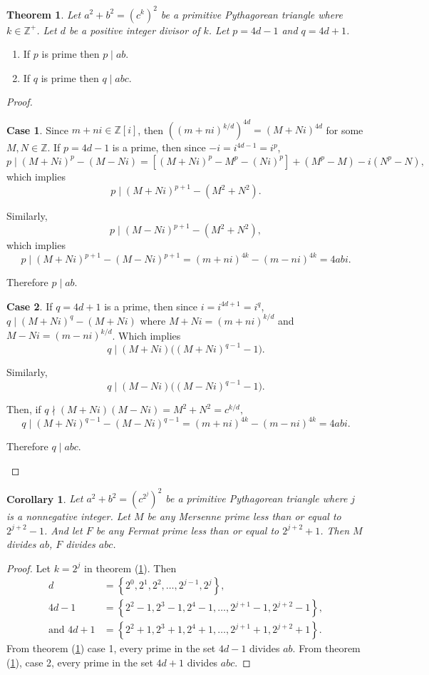 \documentclass{article}
\renewcommand{\labelenumi}{\roman{enumi}.}
\newtheorem{theorem}{Theorem}
\newtheorem{corollary}{Corollary}
\theoremstyle{definition}
\newtheorem{case}{Case}[section]
\begin{document}
\begin{theorem}
Let \(a^2+b^2 = (c^k)^2\) be a primitive Pythagorean triangle where \(k\in \mathbb{Z}^+\). Let \(d\) be a positive integer divisor of \(k\). Let  \(p = 4d-1\) and \(q = 4d+1\).
\label{th:Prime}
\end{theorem}
\renewcommand{\labelenumi}{(\alph{enumi})}
\begin{enumerate}
\item If \(p\) is prime then \(p\mid ab\).
\item If \(q\) is prime then \(q\mid abc\).
\end{enumerate}
\begin{proof}
\begin{case}
Since \(m+ni \in \mathbb{Z}[i]\), then  \(((m+ni)^{k/d})^{4d} = (M+Ni)^{4d}\) for some  \(M, N\in \mathbb{Z}\). If \(p=4d-1\) is a prime, then since \(-i=i^{4d-1}=i^p\), \[ p \mid (M+Ni)^p-(M-Ni)= [ (M+Ni)^p - M^p - (Ni)^p ] + (M^p-M)-i(N^p-N), \] which implies \[ p\mid (M+Ni)^{p+1} - (M^2+N^2). \]

Similarly, \[ p\mid (M-Ni)^{p+1} - ( M^2+N^2 ), \] which implies \[ p \mid  (M+Ni)^{p+1}-(M-Ni)^{p+1} = (m+ni)^{4k}-(m-ni)^{4k} = 4abi. \]

Therefore \(p\mid ab\).
\end{case}
\begin{case}
If \(q = 4d+1\) is a prime, then since  \(i = i^{4d+1} = i^q\), \( q\mid(M+Ni)^q - (M+Ni)\) where  \(M+Ni=(m+ni)^{k/d}\) and \(M-Ni=(m-ni)^{k/d}\). Which implies \[ q\mid (M+Ni) \big((M+Ni)^{q-1}-1\big). \]

Similarly, \[ q\mid(M-Ni) \big((M-Ni)^{q-1}-1\big). \]

Then, if \( q\nmid (M+Ni)(M-Ni) = M^2+N^2 = c^{k/d}, \) \[ q \mid (M+Ni)^{q-1}-(M-Ni)^{q-1} = (m+ni)^{4k}-(m-ni)^{4k}=4abi. \]

Therefore \(q \mid abc\).
\end{case}
\end{proof}

\begin{corollary}
Let \(a^2+b^2 = (c^{2^j})^2\) be a primitive Pythagorean triangle where \(j\) is a nonnegative integer. Let \(M\) be any Mersenne prime less than or equal to \(2^{j+2}-1\). And let \(F\) be any Fermat prime less than or equal to \(2^{j+2}+1\). Then \(M\) divides \(ab\), \(F\) divides \(abc\). \label{th:Marsenne}
\end{corollary}

\begin{proof}
Let \(k=2^j\) in theorem (\ref{th:Prime}). Then \[\begin{aligned} d &= \left\{ 2^0, 2^1, 2^2,\ldots , 2^{j-1}, 2^j \right\}, \\ 4d-1 &=\left\{ 2^2-1, 2^3-1, 2^4-1,\ldots ,2^{j+1}-1, 2^{j+2}-1 \right\}, \\ \text{and } 4d+1 &= \left\{ 2^2+1, 2^3+1, 2^4+1,\ldots ,2^{j+1}+1, 2^{j+2}+1 \right\}.
\end{aligned}\]
From theorem (\ref{th:Prime}) case 1, every prime in the set \(4d-1\) divides \(ab\). From theorem (\ref{th:Prime}), case 2, every prime in the set \(4d+1\) divides \(abc\).
\end{proof}
\end{document}
